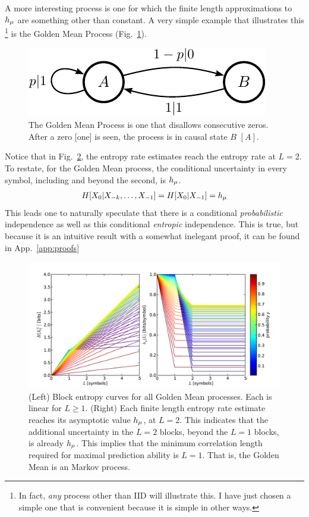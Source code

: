 A more interesting process is one for which the finite length approximations to $h_\mu$ are something other than constant. A very simple example that illustrates this \footnote{In fact, \emph{any} process other than IID will illustrate this. I have just chosen a simple one that is convenient because it is simple in other ways.} is the Golden Mean Process (Fig.~\ref{fig:GM_eM}).
\begin{figure}[h!]
\centering
\includegraphics[scale = 1.0]{../chapter1/figures/goldenmean_feM_gr}
\caption{The Golden Mean Process is one that disallows consecutive zeros. After a zero [one] is seen, the process is in causal state $B$ $[A]$.}
\label{fig:GM_eM}
\end{figure}
Notice that in Fig.~\ref{fig:BE_GM_all}, the entropy rate estimates reach the entropy rate at $L=2$. To restate, for the Golden Mean process, the conditional uncertainty in every symbol, including and beyond the second, is $h_\mu$. 
\begin{align*}
H[{X}_0 | {X}_{-k}, \ldots, {X}_{-1}] = H[{X}_0 | {X}_{-1}] = h_\mu
\end{align*}
This leads one to naturally speculate that there is a conditional \emph{probabilistic} independence as well as this conditional \emph{entropic} independence. This is true, but because it is an intuitive result with a somewhat inelegant proof, it can be found in App.~\ref{app:proofs}
\begin{figure}[h!]
\centering
\includegraphics[scale = 0.6]{../chapter1/figures/scripts/BE_GM_all}
\caption{(Left) Block entropy curves for all Golden Mean processes. Each is linear for $L\ge1$. (Right) Each finite length entropy rate estimate reaches its asymptotic value $h_\mu$, at $L=2$. This indicates that the additional uncertainty in the $L=2$ blocks, beyond the $L=1$ blocks, is already $h_\mu$. This implies that the minimum correlation length required for maximal prediction ability is $L=1$. That is, the Golden Mean is an  Markov process.}
\label{fig:BE_GM_all}
\end{figure}

